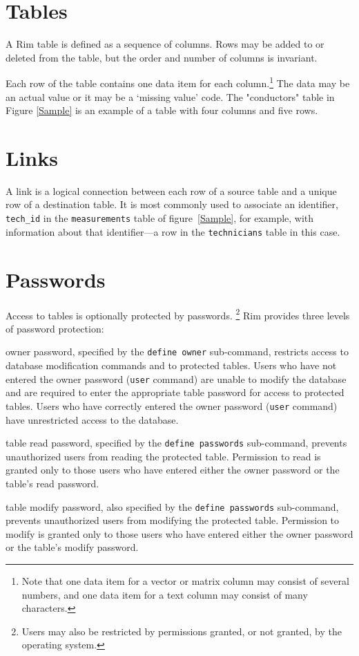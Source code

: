 \documentclass[11pt,a4paper]{report}
\def\I{\index}
\begin{document}
\section{Tables}
\I{table}
A Rim table is defined as a sequence of columns.
Rows may be added to or deleted from the table, but the
order and number of columns is invariant.
 
Each row of the table contains one data item for each
column.\footnote{Note that one data item for a vector or
matrix column may consist of several numbers, and one data item
for a text column may consist of many characters.}
The data may be an actual value or it may be a `missing value' code.
The "conductors" table in Figure \ref{Sample} is an example
of a table with four columns and five rows.
 
 
 
\section{Links}
\I{link}
A link is a logical connection between
each row of a source table and a unique
row of a destination table.
It is most commonly used to associate an identifier,
\verb!tech_id! in the \verb!measurements! table of
figure~\ref{Sample}, for example,
with information about that identifier---a row in the
\verb!technicians! table in this case.
 
\section{Passwords}
\I{password}
Access to tables is optionally protected by passwords.%
\footnote{Users may also be restricted by permissions granted,
or not granted,
by the operating system.}
Rim provides three levels of password protection:
 
\begin{List}
\item[owner password,] specified by the \verb!define owner! sub-command,
restricts access to database modification commands and to protected
tables.
Users who have not entered the owner password (\verb!user! command)
are unable to modify the database and are required to
enter the appropriate table password for access to
protected tables.
Users who have correctly entered the owner password (\verb!user! command)
have unrestricted access to the database.
\item[table read password,]
specified by the \verb!define passwords! sub-command,
prevents unauthorized users from reading the protected table.
Permission to read is granted only to those users who have entered
either the owner password or the table's read password.
\item[table modify password,] also
specified by the \verb!define passwords! sub-com\-mand,
prevents unauthorized users from modifying the protected table.
Permission to modify is granted only to those users who have entered
either the owner password or the table's modify password.
\end{List}
 
\end{document}
